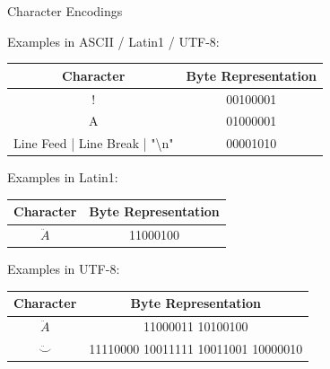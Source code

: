\documentclass[
	11pt, 
]{beamer}
\begin{document}
\begin{frame}{Character Encodings}

Examples in ASCII / Latin1 / UTF-8:

\begin{center}
\vspace{.1cm}
\begin{tabular}{|c|c|}
\hline
Character & Byte Representation \\
\hline
! & 00100001 \\
A & 01000001 \\
Line Feed | Line Break | "\textbackslash{}n" & 00001010 \\
\hline
\end{tabular}
\end{center}

Examples in Latin1:

\begin{center}
\vspace{.1cm}
\renewcommand{\arraystretch}{1.3}
\begin{tabular}{|c|c|}
\hline
Character & Byte Representation \\
\hline
$\ddot{A}$ & 11000100 \\
\hline
\end{tabular}
\end{center}

Examples in UTF-8:

\begin{center}
\vspace{.1cm}
\renewcommand{\arraystretch}{1.3}
\begin{tabular}{|c|c|}
\hline
Character & Byte Representation \\
\hline
$\ddot{A}$ & 11000011 10100100 \\
$\ddot\smile$ & 11110000 10011111 10011001 10000010 \\
\hline
\end{tabular}
\end{center}
    
\end{frame}

\end{document}
